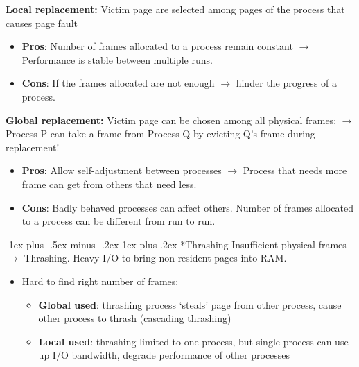 \documentclass[10pt,landscape]{article}
\makeatletter
\renewcommand{\subsubsection}{\@startsection{subsubsection}{3}{0mm}%
                                {-1ex plus -.5ex minus -.2ex}%
                                {1ex plus .2ex}%
                                {\normalfont\small\bfseries}}
\makeatother
\begin{document}
\begin{multicols*}{3}
\textbf{Local replacement:} Victim page are selected among pages of the process that causes
page fault 
\begin{itemize}[topsep=0pt,noitemsep,wide=0pt, leftmargin=\dimexpr{} + 2\relax]
    \item \textbf{Pros}: Number of frames allocated to a process remain constant
    $\rightarrow$ Performance is stable between multiple runs.
    \item \textbf{Cons}: If the frames allocated are not enough
    $\rightarrow$ hinder the progress of a process.
\end{itemize}

\textbf{Global replacement:} Victim page can be chosen among all physical frames:
$\rightarrow$ Process P can take a frame from Process Q by evicting Q's frame during replacement!

\begin{itemize}[topsep=0pt,noitemsep,wide=0pt, leftmargin=\dimexpr{} + 2\relax]
    \item \textbf{Pros}: Allow self-adjustment between processes
    $\rightarrow$ Process that needs more frame can get from others that need less.
    \item \textbf{Cons}: Badly behaved processes can affect others. Number of frames allocated to a process can be different from run to run.
\end{itemize}

\subsubsection*{Thrashing}
Insufficient physical frames $\rightarrow$ Thrashing. Heavy I/O to bring non-resident pages into RAM.
\begin{itemize}[topsep=0pt,noitemsep,wide=0pt, leftmargin=\dimexpr{} + 2\relax]
    \item Hard to find right number of frames:
    \begin{itemize}[topsep=0pt,noitemsep,wide=0pt, leftmargin=\dimexpr{} + 2\relax]
        \item \textbf{Global used}: thrashing process `steals' page from other process, cause other process to thrash (cascading thrashing)
        \item \textbf{Local used}: thrashing limited to one process, but single process can use up I/O bandwidth, degrade performance of other processes
    \end{itemize}
\end{itemize}


\end{multicols*}
\end{document}
